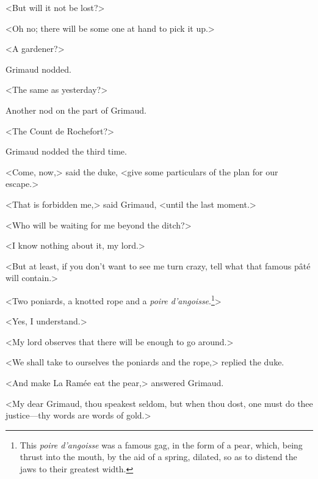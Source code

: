 <But will it not be lost?>

<Oh no; there will be some one at hand to pick it up.>

<A gardener?>

Grimaud nodded.

<The same as yesterday?>

Another nod on the part of Grimaud.

<The Count de Rochefort?>

Grimaud nodded the third time.

<Come, now,> said the duke, <give some particulars of the plan for our escape.>

<That is forbidden me,> said Grimaud, <until the last moment.>

<Who will be waiting for me beyond the ditch?>

<I know nothing about it, my lord.>

<But at least, if you don't want to see me turn crazy, tell what that famous pâté will contain.>

<Two poniards, a knotted rope and a \textit{poire d'angoisse}.\footnote{This \textit{poire d'angoisse} was a famous gag, in the form of a pear, which, being thrust into the mouth, by the aid of a spring, dilated, so as to distend the jaws to their greatest width.}> 

<Yes, I understand.>

<My lord observes that there will be enough to go around.>

<We shall take to ourselves the poniards and the rope,> replied the duke.

<And make La Ramée eat the pear,> answered Grimaud.

<My dear Grimaud, thou speakest seldom, but when thou dost, one must do thee justice—thy words are words of gold.> 